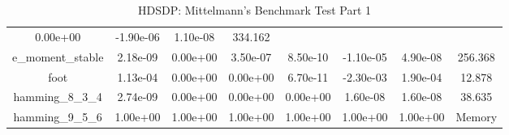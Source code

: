{{\begin{table}[h]
\begin{center}
{\begin{tabular}{cccccccc}
      0.00e+00 & -1.90e-06 & 1.10e-08 & 334.162\\
      e\_moment\_stable & 2.18e-09 & 0.00e+00 & 3.50e-07 &
      8.50e-10 & -1.10e-05 & 4.90e-08 & 256.368\\
      foot & 1.13e-04 & 0.00e+00 & 0.00e+00 & 6.70e-11 &
      -2.30e-03 & 1.90e-04 & 12.878\\
      hamming\_8\_3\_4 & 2.74e-09 & 0.00e+00 & 0.00e+00 &
      0.00e+00 & 1.60e-08 & 1.60e-08 & 38.635\\
      hamming\_9\_5\_6 & 1.00e+00 & 1.00e+00 & 1.00e+00 & 1.00e+00
      & 1.00e+00 & 1.00e+00 & Memory\\
      \bottomrule
    \end{tabular}
  }  
\end{center}
  \caption{HDSDP: Mittelmann's Benchmark Test Part 1}
\end{table}}}

